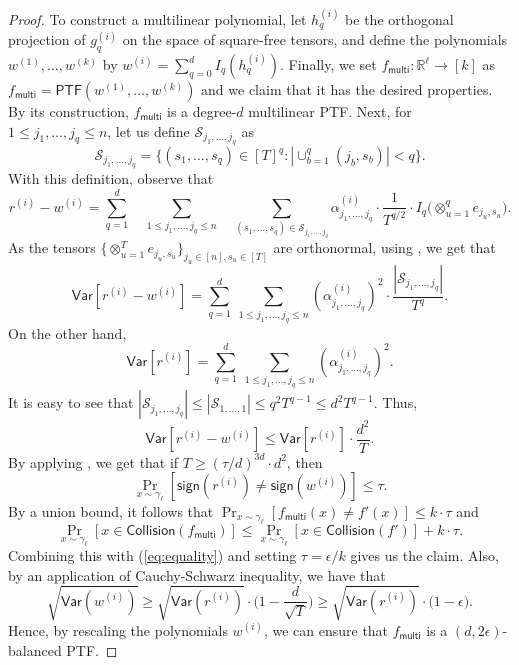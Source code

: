 \documentclass{toc}
\begin{document}
\begin{proof}
To construct a multilinear polynomial, let $h_q^{(i)}$ be the orthogonal
projection of $g_q^{(i)}$ on the space of square-free tensors, and define the
polynomials $w^{(1)}, \ldots, w^{(k)}$ by
$
w^{(i)} = \sum_{q=0}^d I_q(h_{q}^{(i)}). 
$
Finally, we set $f_{\mathsf{multi}} : \mathbb{R}^{\ell} \rightarrow [k]$ as $f_{\mathsf{multi}} = \mathsf{PTF} (w^{(1)}, \ldots, w^{(k)})$
and we claim that it has the desired properties. By its construction, $f_{\mathsf{multi}}$ is a degree-$d$ multilinear PTF\@.
Next,  for $1 \le j_1, \ldots, j_q \le n$, let us define $\mathcal{S}_{j_1, \ldots, j_q}$ as 
$$
\mathcal{S}_{j_1, \ldots, j_q} = \{(s_1, \ldots, s_q) \in [T]^q : | \cup_{b=1}^q (j_b, s_b) | <  q\}. 
$$
With this definition, observe that
\[
r^{(i)} - w^{(i)}
=  \sum_{q=1}^d \quad \sum_{1 \le j_1, \ldots, j_q \le n}\quad \sum_{(s_1, \ldots, s_q) \in \mathcal{S}_{j_1, \ldots, j_q} } \alpha^{(i)}_{j_1, \ldots, j_q}   \cdot \frac{1}{T^{q/2}} \cdot I_q \big(\otimes_{u=1}^q e_{j_u, s_u} \big).
\]
As the tensors $\{\otimes_{u=1}^T e_{j_u, s_u} \}_{j_u \in [n], s_u \in [T]}$ are orthonormal, using , we get that
$$
\mathsf{Var}[r^{(i)} -  w^{(i)} ] = \sum_{q=1}^d\ \sum_{1 \le j_1, \ldots, j_q \le n}  (\alpha^{(i)}_{j_1, \ldots, j_q})^2 \cdot \frac{|\mathcal{S}_{j_1, \ldots, j_q}|}{T^q}. 
$$
On the other hand, 
$$
\mathsf{Var}[r^{(i)}] = \sum_{q=1}^d\ \sum_{1 \le j_1, \ldots, j_q \le n}  (\alpha^{(i)}_{j_1, \ldots, j_q})^2.
$$
It is easy to see that $|\mathcal{S}_{j_1, \ldots, j_q}| \le |\mathcal{S}_{1,\ldots,1}| \le q^2 T^{q-1} \le d^2 T^{q-1}$. Thus,
$$
\mathsf{Var}[r^{(i)} - w^{(i)} ] \leq \mathsf{Var}[r^{(i)} ] \cdot \frac{d^2}{T}. 
$$
By applying , we get that if $T \ge (\tau/d)^{3d} \cdot d^2$, then 
$$
\Pr_{x \sim \gamma_\ell} [\mathsf{sign} (r^{(i)})  \neq  \mathsf{sign} (w^{(i)})] \le \tau. 
$$
By a union bound, it follows that
$
\Pr_{x \sim \gamma_\ell} [f_{\mathsf{multi}}(x) \neq  f'(x)]   \le k \cdot \tau
$
and
\[
\Pr_{x \sim \gamma_\ell} [x \in \mathsf{Collision} (f_{\mathsf{multi}})] \leq \Pr_{x \sim \gamma_\ell} [x \in \mathsf{Collision} (f')] + k \cdot \tau. 
\]
Combining this with (\ref{eq:equality}) and setting $\tau = \epsilon/k$ gives us the claim. Also, by an application of Cauchy-Schwarz inequality, we have that 
\[
\sqrt{\mathsf{Var}(w^{(i)})} \ge \sqrt{\mathsf{Var}(r^{(i)})}  \cdot \bigg( 1- \frac{d}{\sqrt{T}}\bigg) \ge \sqrt{\mathsf{Var}(r^{(i)})}  \cdot \big( 1- \epsilon\big).
\]
Hence, by rescaling the polynomials $w^{(i)}$,  we can ensure that $f_{\mathsf{multi}}$ is a $(d,2\epsilon)$-balanced PTF.
\end{proof}
\end{document}
